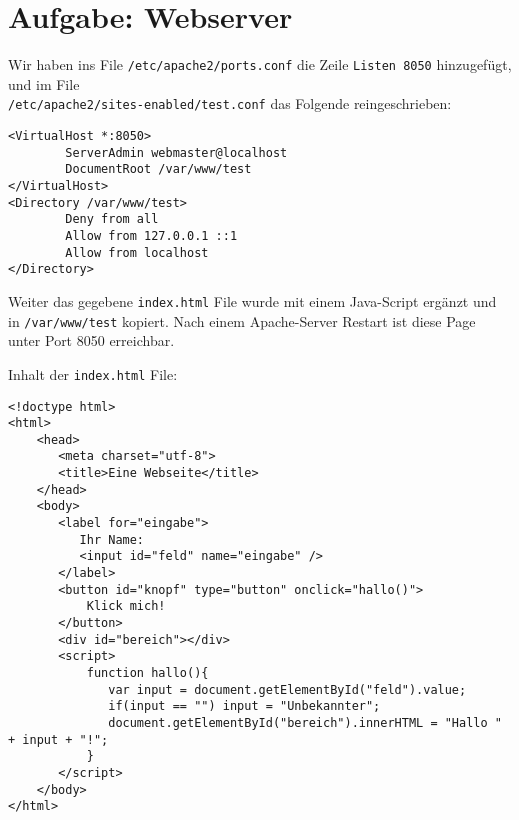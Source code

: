 \documentclass[paper=a4, english, ngerman, romanian]{scrartcl}
\begin{document}
 	\section{Aufgabe: Webserver}
 	Wir haben ins File \lstinline[basicstyle=\ttfamily\small]|/etc/apache2/ports.conf| die Zeile  \lstinline[basicstyle=\ttfamily\small]|Listen 8050| hinzugefügt, und im File \ \\ \lstinline[basicstyle=\ttfamily\small]|/etc/apache2/sites-enabled/test.conf| das Folgende reingeschrieben:
	\begin{lstlisting}
<VirtualHost *:8050>
        ServerAdmin webmaster@localhost
        DocumentRoot /var/www/test
</VirtualHost>
<Directory /var/www/test>
        Deny from all
        Allow from 127.0.0.1 ::1
        Allow from localhost
</Directory>
	\end{lstlisting}
	Weiter das gegebene \lstinline[basicstyle=\ttfamily\small]|index.html| File wurde mit einem Java-Script ergänzt und in \lstinline[basicstyle=\ttfamily\small]|/var/www/test| kopiert. Nach einem Apache-Server Restart ist diese Page unter Port 8050 erreichbar.

	Inhalt der \lstinline[basicstyle=\ttfamily\small]|index.html| File:
	\begin{lstlisting}
<!doctype html>
<html>
    <head>
       <meta charset="utf-8">
       <title>Eine Webseite</title>
    </head>
    <body>
       <label for="eingabe">
          Ihr Name:
          <input id="feld" name="eingabe" />
       </label>
       <button id="knopf" type="button" onclick="hallo()">
           Klick mich!
       </button>
       <div id="bereich"></div>
       <script>
           function hallo(){
		      var input = document.getElementById("feld").value;
              if(input == "") input = "Unbekannter";      
              document.getElementById("bereich").innerHTML = "Hallo " + input + "!";
           }
       </script>
    </body>
</html>

	\end{lstlisting}
	
\end{document}
